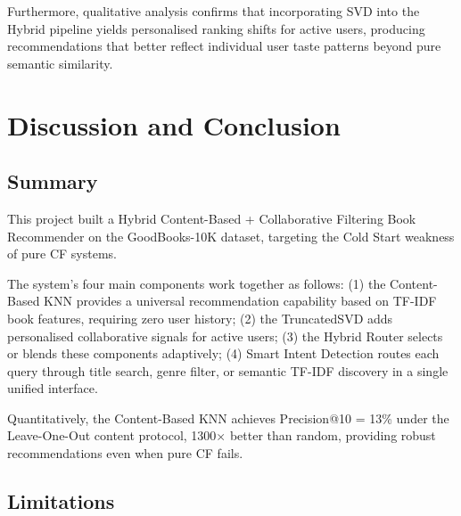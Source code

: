 \documentclass[12pt, a4paper]{article}
\begin{document}
Furthermore, qualitative analysis confirms that incorporating SVD into the Hybrid
pipeline yields personalised ranking shifts for active users, producing recommendations
that better reflect individual user taste patterns beyond pure semantic similarity.

\newpage
\section{Discussion and Conclusion}
\label{sec:conclusion}

\subsection{Summary}

This project built a Hybrid Content-Based + Collaborative Filtering Book Recommender
on the GoodBooks-10K dataset, targeting the Cold Start weakness of pure CF systems.

The system's four main components work together as follows:
(1) the Content-Based KNN provides a universal recommendation capability
based on TF-IDF book features, requiring zero user history;
(2) the TruncatedSVD adds personalised collaborative signals for active users;
(3) the Hybrid Router selects or blends these components adaptively;
(4) Smart Intent Detection routes each query through title search,
genre filter, or semantic TF-IDF discovery in a single unified interface.

Quantitatively, the Content-Based KNN achieves Precision@10 = 13\%
under the Leave-One-Out content protocol,
1300$\times$ better than random, providing robust recommendations even when pure CF fails.

\subsection{Limitations}
\end{document}
